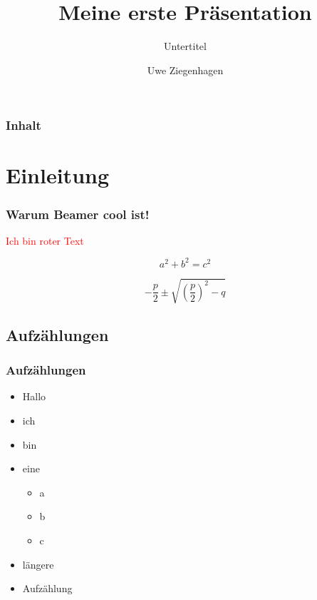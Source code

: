 \documentclass[12pt,ngerman]{beamer}
\author{Uwe Ziegenhagen}
\title{Meine erste Präsentation}
\subtitle{Untertitel}
\institute{Köln}
\begin{document}
\begin{frame}
\transboxout

\maketitle

\end{frame}

\begin{frame}
\frametitle{Inhalt}

\tableofcontents

\end{frame}

\section{Einleitung}


\begin{frame}
\transdissolve
\frametitle{Warum Beamer cool ist!}

\textcolor{red}{Ich bin roter Text}

\begin{equation}
a^2+b^2=c^2
\end{equation}

\pause

\begin{equation}
-\frac{p}{2} \pm \sqrt{ \left(\frac{p}{2}\right)^2 -q }
\end{equation}

\end{frame}

\subsection{Aufzählungen}

\begin{frame}
\frametitle{Aufzählungen}

\begin{itemize}
\item Hallo
\item ich 
\item bin
\item eine

\begin{itemize}
	\item a
	\item b
	\item c
\end{itemize}

\item längere
\item Aufzählung
\end{itemize}
\end{frame}
\end{document}
